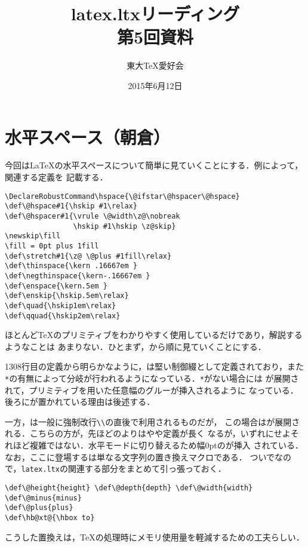 \documentclass[autodetect-engine,dvipdfmx]{jsarticle}
\begin{document}
\title{ latex.ltxリーディング \\ 第5回資料 }
\author{ 東大\TeX 愛好会 }
\date{2015年6月12日}
\maketitle

\section{水平スペース（朝倉）}

今回は\LaTeX の水平スペースについて簡単に見ていくことにする．例によって，関連する定義を
記載する．

\latexltx
\begin{lstlisting}[firstnumber=1308]
\DeclareRobustCommand\hspace{\@ifstar\@hspacer\@hspace}
\def\@hspace#1{\hskip #1\relax}
\def\@hspacer#1{\vrule \@width\z@\nobreak
                \hskip #1\hskip \z@skip}
\newskip\fill
\fill = 0pt plus 1fill
\def\stretch#1{\z@ \@plus #1fill\relax}
\def\thinspace{\kern .16667em }
\def\negthinspace{\kern-.16667em }
\def\enspace{\kern.5em }
\def\enskip{\hskip.5em\relax}
\def\quad{\hskip1em\relax}
\def\qquad{\hskip2em\relax}
\end{lstlisting}

ほとんど\TeX のプリミティブをわかりやすく使用しているだけであり，解説するようなことは
あまりない．ひとまず，から順に見ていくことにする．

1308行目の定義から明らかなように，は堅い制御綴として定義されており，また\preSub
\texttt{*}\preSub の有無によって分岐が行われるようになっている．\texttt{*}\preSub がない場合には
が展開されて，プリミティブを用いた任意幅のグルーが挿入されるように
なっている．後ろにが置かれている理由は後述する．

一方，\preSub は一般に強制改行\preSub\verb|\\|\preSub の直後で利用されるものだが，
この場合はが展開される．こちらの方が，先ほどのよりはやや定義が長く
なるが，いずれにせよそれほど複雑ではない．水平モードに切り替えるため幅0ptのが挿入
されている．なお，ここに登場するは単なる文字列の置き換えマクロである．
ついでなので，\texttt{latex.ltx}の関連する部分をまとめて引っ張っておく．
\begin{lstlisting}[firstnumber=563]
\def\@height{height} \def\@depth{depth} \def\@width{width}
\def\@minus{minus}
\def\@plus{plus}
\def\hb@xt@{\hbox to}
\end{lstlisting}
こうした置換えは，\TeX の処理時にメモリ使用量を軽減するための工夫らしい．
\end{document}
